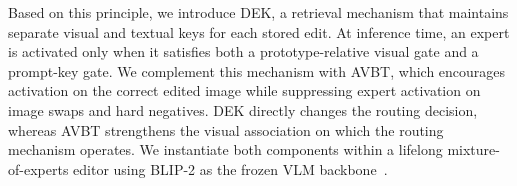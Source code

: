 \documentclass[letterpaper]{article} %
\begin{document}

Based on this principle, we introduce DEK, a retrieval mechanism that maintains separate visual and textual keys for each stored edit. At inference time, an expert is activated only when it satisfies both a prototype-relative visual gate and a prompt-key gate. We complement this mechanism with AVBT, which encourages activation on the correct edited image while suppressing expert activation on image swaps and hard negatives. DEK directly changes the routing decision, whereas AVBT strengthens the visual association on which the routing mechanism operates. We instantiate both components within a lifelong mixture-of-experts editor using BLIP-2 as the frozen VLM backbone~\citep{li2023blip2,chen2025liveedit}.

\end{document}
